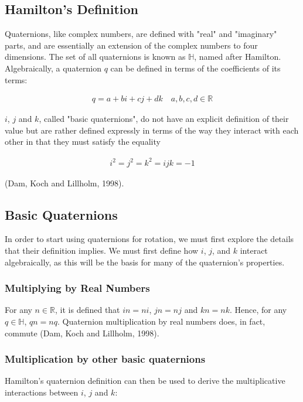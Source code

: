 \documentclass[12pt, a4paper]{article}
\begin{document}
\pagebreak

\subsection{Hamilton's Definition}
Quaternions, like complex numbers, are defined with "real" and "imaginary"
parts, and are essentially an extension of the complex numbers to four
dimensions. The set of all quaternions is known as $\mathbb{H}$, named after
Hamilton. Algebraically, a quaternion $q$ can be defined in terms of the
coefficients of its terms:

\begin{align*}
    q = a + bi + cj + dk \quad a, b, c, d \in \mathbb{R}
\end{align*}

$i$, $j$ and $k$, called "basic quaternions", do not have an explicit definition
of their value but are rather defined expressly in terms of the way they
interact with each other in that they must satisfy the equality

\begin{align*}
    i^2 = j^2 = k^2 = ijk = -1
\end{align*}

\qquad\qquad\qquad\qquad\qquad\qquad\qquad\qquad\qquad\qquad\qquad\qquad\qquad\qquad\qquad
(Dam, Koch and Lillholm, 1998).

\subsection{Basic Quaternions}
In order to start using quaternions for rotation, we must first explore the
details that their definition implies. We must first define how $i$, $j$, and
$k$ interact algebraically, as this will be the basis for many of the
quaternion's properties.
\subsubsection{Multiplying by Real Numbers}
For any $n \in \mathbb{R}$, it is defined that $in = ni$, $jn = nj$ and $kn =
    nk$. Hence, for any $q \in \mathbb{H}$, $qn = nq$. Quaternion multiplication by
real numbers does, in fact, commute (Dam, Koch and Lillholm, 1998).

\subsubsection{Multiplication by other basic quaternions}
Hamilton's quaternion definition can then be used to derive the multiplicative
interactions between $i$, $j$ and $k$:
\end{document}
